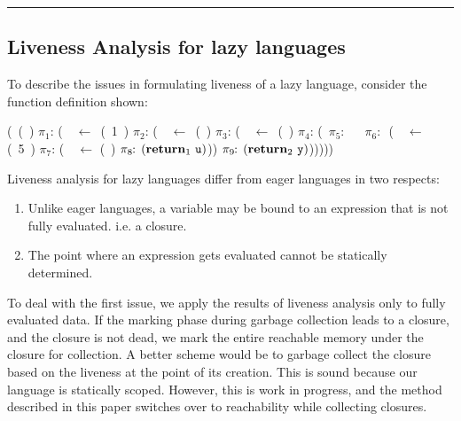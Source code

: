 \documentclass[10pt]{sigplanconf}
\begin{document}
\bigskip
\hrule 
\bigskip

\subsection{Liveness Analysis for lazy languages}

To describe  the issues  in formulating liveness  of a  lazy language,
consider the function definition shown:

\renewcommand{\arraystretch}{1}{
	  \begin{uprogram}
	   (\DEFINE\ (\pf~\pa)
	    $\pi_1\!\!:\, $(\LET\ \px\ $\leftarrow $\ (\CONS~1~\px) \IN
	        $\pi_2\!\!:\, $(\LET~\py\ $\leftarrow $\ (\CDR~\px) \IN  
           \hspace*{.05cm}     $\pi_3\!\!:\,
          $(\LET\ \pz\  $\leftarrow$\   (\NULLQ~\pa) \IN
	    \hspace*{.05cm}    $\pi_4\!\!:\,
          $(\SIF\ $\pi_5\!\!:\,$ \pz\ ~$\pi_6\!\!:\,$ (\LET~\ww\  $\leftarrow$  (\take~5~\px) \IN
	   \hspace*{1.15cm}    $\pi_7\!\!:\, $(\LET~\pu\  $\leftarrow$  (\CDR~\pw)  \IN
	    \hspace*{1.15cm}   $\pi_8\!\!:\,(\mbox{$\mathbf{ return}$}_1~\mbox{\tt u})$))
           \hspace*{.05cm} $\pi_9\!\!:\, (\mbox{$\mathbf{ return}$}_2~\mbox{\tt y})$)))))
	\end{uprogram}}
\medskip

Liveness analysis for lazy languages differ from eager languages in
two respects:
\begin{enumerate}
\item Unlike eager languages, a variable may be  bound to an
  expression that is not fully evaluated. i.e. a closure.
\item The point where an expression gets evaluated cannot be statically
  determined.
\end{enumerate}

To  deal  with the  first  issue, we  apply  the  results of  liveness
analysis only  to fully evaluated  data.  If the marking  phase during
garbage collection leads to a closure, and the closure is not dead, we
mark the entire reachable memory  under the closure for collection.  A
better scheme  would be  to garbage collect  the closure based  on the
liveness  at the point  of its  creation.  This  is sound  because our
language is statically scoped.  However, this is work in progress, and
the method described in this paper switches over to reachability while
collecting closures.
\end{document}
